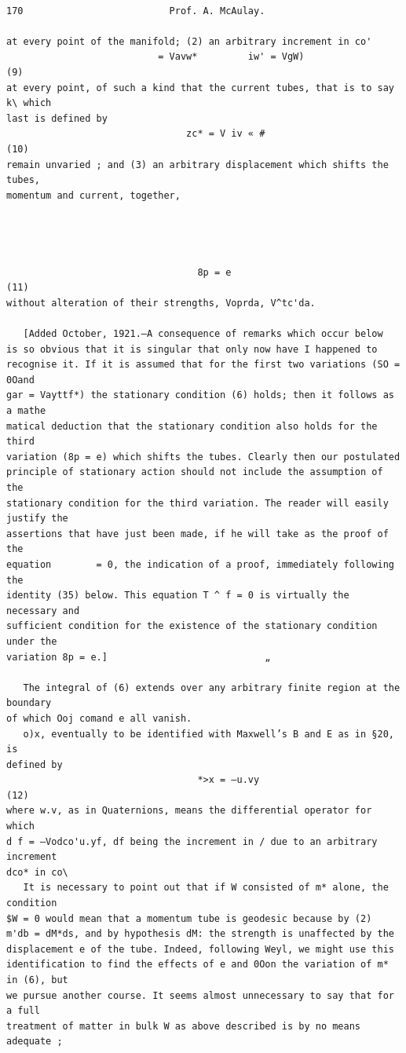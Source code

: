 \documentclass[10pt]{article}
\begin{document}
\clearpage
\begin{verbatim}

170                          Prof. A. McAulay.

at every point of the manifold; (2) an arbitrary increment in co'
                           = Vavw*         iw' = VgW)                       (9)
at every point, of such a kind that the current tubes, that is to say k\ which
last is defined by
                                zc* = V iv « #                            (10)
remain unvaried ; and (3) an arbitrary displacement which shifts the tubes,
momentum and current, together,




                                  8p = e                               (11)
without alteration of their strengths, Voprda, V^tc'da.

   [Added October, 1921.—A consequence of remarks which occur below
is so obvious that it is singular that only now have I happened to
recognise it. If it is assumed that for the first two variations (SO = 0Oand
gar = Vayttf*) the stationary condition (6) holds; then it follows as a mathe­
matical deduction that the stationary condition also holds for the third
variation (8p = e) which shifts the tubes. Clearly then our postulated
principle of stationary action should not include the assumption of the
stationary condition for the third variation. The reader will easily justify the
assertions that have just been made, if he will take as the proof of the
equation        = 0, the indication of a proof, immediately following the
identity (35) below. This equation T ^ f = 0 is virtually the necessary and
sufficient condition for the existence of the stationary condition under the
variation 8p = e.]                            „

   The integral of (6) extends over any arbitrary finite region at the boundary
of which Ooj comand e all vanish.
   o)x, eventually to be identified with Maxwell’s B and E as in §20, is
defined by
                                  *>x = —u.vy                              (12)
where w.v, as in Quaternions, means the differential operator for which
d f = —Vodco'u.yf, df being the increment in / due to an arbitrary increment
dco* in co\
   It is necessary to point out that if W consisted of m* alone, the condition
$W = 0 would mean that a momentum tube is geodesic because by (2)
m'db = dM*ds, and by hypothesis dM: the strength is unaffected by the
displacement e of the tube. Indeed, following Weyl, we might use this
identification to find the effects of e and 0Oon the variation of m* in (6), but
we pursue another course. It seems almost unnecessary to say that for a full
treatment of matter in bulk W as above described is by no means adequate ;


\end{verbatim}
\end{document}
